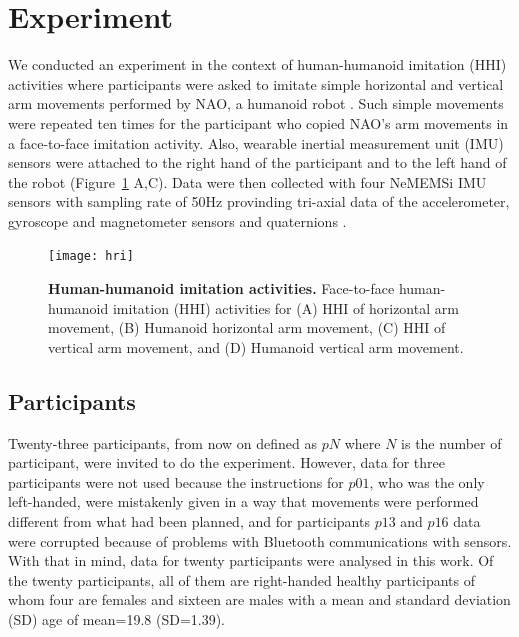 \documentclass[fleqn,10pt]{wlscirep}
\begin{document}
\section*{Experiment} \label{sec:experiment}
We conducted an experiment in the context of human-humanoid imitation (HHI) 
activities where participants were asked to imitate simple horizontal and 
vertical arm movements performed by NAO, a humanoid robot \cite{gouaillier2009}.
Such simple movements were repeated ten times for the participant 
who copied NAO's arm movements in a face-to-face imitation activity.
Also, wearable inertial measurement unit (IMU) sensors were attached 
to the right hand of the participant and to the left hand of the robot 
(Figure~\ref{fig:hri} A,C). Data were then collected with four NeMEMSi 
IMU sensors with sampling rate of 50Hz provinding tri-axial data of the 
accelerometer, gyroscope and magnetometer sensors and quaternions 
\cite{Comotti2014}.
\begin{figure}[ht]
  \centering
\texttt{[image: hri]}
    \caption{
	{\bf Human-humanoid imitation activities.} 
    		Face-to-face human-humanoid imitation (HHI) activities for 
		(A) HHI of horizontal arm movement, 
		(B) Humanoid horizontal arm movement,
		(C) HHI of vertical arm movement, and 
		(D) Humanoid vertical arm movement.
        }
    \label{fig:hri}
\end{figure}

\subsection*{Participants}
Twenty-three participants,
from now on defined as $pN$ where $N$ is the number of participant, were 
invited to do the experiment. However, data for three participants were 
not used because the instructions for $p01$, who was the only left-handed,
were mistakenly given in a way that movements were performed different
from what had been planned, and for participants $p13$ and $p16$ 
data were corrupted because of problems with Bluetooth communications with sensors. 
With that in mind, data for twenty participants were analysed in this work.
Of the twenty participants, all of them are right-handed healthy participants 
of whom four are females and sixteen are males with a mean and standard 
deviation (SD) age of mean=19.8 (SD=1.39). 
\end{document}
